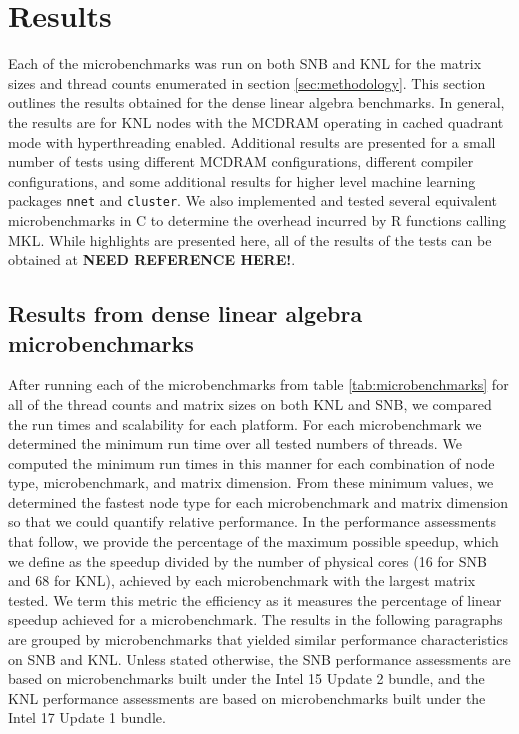 \section{Results} \label{sec:results}

Each of the microbenchmarks was run on both SNB and KNL for the matrix sizes and thread
counts enumerated in section \ref{sec:methodology}. This section outlines the results
obtained for the dense linear algebra benchmarks. In general, the results are for KNL
nodes with the MCDRAM operating in cached quadrant mode with hyperthreading enabled.
Additional results are presented for a small number of tests using different MCDRAM
configurations, different compiler configurations, and some additional results for higher
level machine learning packages \texttt{nnet} and \texttt{cluster}. We also implemented
and tested several equivalent microbenchmarks in C to determine the overhead incurred by R
functions calling MKL. While highlights are presented here, all of the results of the
tests can be obtained at {\bf NEED REFERENCE HERE!}.


\subsection{Results from dense linear algebra microbenchmarks}

After running each of the microbenchmarks from table \ref{tab:microbenchmarks} for all of
the thread counts and matrix sizes on both KNL and SNB, we compared the run times and
scalability for each platform. For each microbenchmark we determined the minimum run time
over all tested numbers of threads. We computed the minimum run times in this manner for
each combination of node type, microbenchmark, and matrix dimension. From these minimum
values, we determined the fastest node type for each microbenchmark and matrix dimension
so that we could quantify relative performance. In the performance assessments that
follow, we provide the percentage of the maximum possible speedup, which we define as the
speedup divided by the number of physical cores (16 for SNB and 68 for KNL), achieved by
each microbenchmark with the largest matrix tested. We term this metric the efficiency as
it measures the percentage of linear speedup achieved for a microbenchmark. The results in
the following paragraphs are grouped by microbenchmarks that yielded similar performance
characteristics on SNB and KNL. Unless stated otherwise, the SNB performance assessments
are based on microbenchmarks built under the Intel 15 Update 2 bundle, and the KNL
performance assessments are based on microbenchmarks built under the Intel 17 Update 1
bundle.

